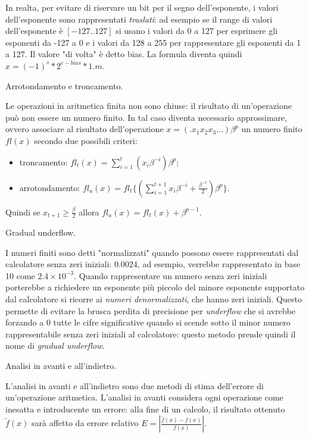 \documentclass[answers, a4paper]{exam}
\begin{document}
\begin{questions}
\begin{solution}
		In realta, per evitare di riservare un bit per il segno dell'esponente, i valori dell'esponente sono rappresentati \textit{traslati}: ad esempio se il range di valori dell'esponente è $[-127..127]$ si usano i valori da 0 a 127 per esprimere gli esponenti da -127 a 0 e i valori da 128 a 255 per rappresentare gli esponenti da 1 a 127.
		Il valore "di volta" è detto bias.
		La formula diventa quindi $ x = (-1)^s * 2^{e - bias} * 1.m$.
	\end{solution}
	\question Arrotondamento e troncamento.
	\begin{solution}Le operazioni in aritmetica finita non sono chiuse: il risultato di un'operazione può non essere un numero finito. 
	In tal caso diventa necessario approssimare, ovvero associare al risultato dell'operazione $x = (.x_1 x_2 x_3 ...) \beta^p$ un numero finito $fl(x)$ secondo due possibili criteri:
	\begin{itemize}
		\item troncamento: $fl_t(x) = \sum\limits_{i = 1}^{t} (x_i \beta^{-i}) \beta^p$;
		\item arrotondamento: $fl_a(x) = fl_t\{(\sum\limits_{i=1}^{t + 1} x_i \beta^{-i} + \frac{\beta^{-t}}{2}) \beta^p\}$.
	\end{itemize}
	Quindi se $x_{t + 1} \geq \frac{\beta}{2}$ allora $fl_a(x) = fl_t(x) + \beta^{p - 1}$.
	\end{solution}
	\question Gradual underflow.
	\begin{solution}
		I numeri finiti sono detti "normalizzati" quando possono essere rappresentati dal calcolatore senza zeri iniziali: $0.0024$, ad esempio, verrebbe rappresentato in base 10 come $2.4 \times 10^{-3}$.
		Quando rappresentare un numero senza zeri iniziali porterebbe a richiedere un esponente più piccolo del minore esponente supportato dal calcolatore si ricorre ai \textit{numeri denormalizzati}, che hanno zeri iniziali. 
		Questo permette di evitare la brusca perdita di precisione per \textit{underflow} che si avrebbe forzando a 0 tutte le cifre significative quando si scende sotto il minor numero rappresentabile senza zeri iniziali al calcolatore: questo metodo prende quindi il nome di \textit{gradual underflow}.
	\end{solution}
	\question Analisi in avanti e all'indietro.
	\begin{solution}
		L'analisi in avanti e all'indietro sono due metodi di stima dell'errore di un'operazione aritmetica.
		L'analisi in avanti considera ogni operazione come inesatta e introducente un errore: alla fine di un calcolo, il risultato ottenuto $\tilde{f}(x)$ sarà affetto da errore relativo $E = |\frac{\tilde{f}(x) - f(x)}{f(x)}|$.

\end{solution}
\end{questions}
\end{document}
